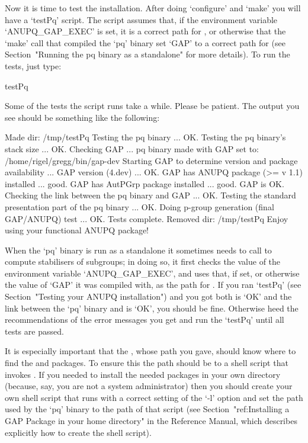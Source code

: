
Now it is time to test the  installation.  After  doing  `configure'  and
`make' you will have a `testPq' script. The script assumes that,  if  the
environment variable `ANUPQ_GAP_EXEC' is set, it is a  correct  path  for
{\GAP}, or otherwise that the `make' call that compiled the  `pq'  binary
set `GAP' to a correct path  for  {\GAP}  (see  Section~"Running  the  pq
binary as a standalone" for more details). To run the tests, just type:

\begintt
testPq
\endtt

Some of the tests the script runs take a while. Please  be  patient.  The
output you see should be something like the following:

\begintt
Made dir: /tmp/testPq
Testing the pq binary ... OK.
Testing the pq binary's stack size ... OK.
Checking GAP ...
 pq binary made with GAP set to: /home/rigel/gregg/bin/gap-dev
 Starting GAP to determine version and package availability ...
  GAP version (4.dev) ... OK.
  GAP has ANUPQ package (>= v 1.1) installed ... good.
  GAP has AutPGrp package installed ... good.
 GAP is OK.
Checking the link between the pq binary and GAP ... OK.
Testing the standard presentation part of the pq binary ... OK.
Doing p-group generation (final GAP/ANUPQ) test ... OK.
Tests complete.
Removed dir: /tmp/testPq
Enjoy using your functional ANUPQ package!
\endtt


When the `pq' binary is run as a standalone it sometimes  needs  to  call
{\GAP} to compute stabilisers of subgroups; in doing so, it first  checks
the value of the environment variable `ANUPQ_GAP_EXEC', and uses that, if
set, or otherwise the value of `GAP' it was compiled with,  as  the  path
for  {\GAP}.  If  you  ran  `testPq'  (see  Section~"Testing  your  ANUPQ
installation") and you got both {\GAP} is `OK' and the link  between  the
`pq' binary and {\GAP} is `OK', you should be fine.  Otherwise  heed  the
recommendations of the error messages you get and run the `testPq'  until
all tests are passed.

It is especially important that the {\GAP}, whose path you  gave,  should
know where to find the {\ANUPQ} and {\AutPGrp} packages. To  ensure  this
the path should be to a shell script that invokes {\GAP}. If  you  needed
to install the needed packages in your own directory (because,  say,  you
are not a system administrator) then you should  create  your  own  shell
script that runs {\GAP} with a correct setting of the `-l' option and set
the path used by the  `pq'  binary  to  the  path  of  that  script  (see
Section~"ref:Installing a GAP Package in  your  home  directory"  in  the
Reference Manual, which describes explicitly  how  to  create  the  shell
script).

